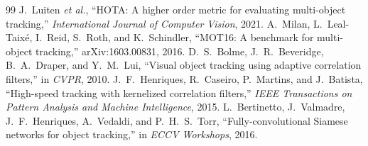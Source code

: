\documentclass[11pt,a4paper]{article}
\begin{document}
\begin{thebibliography}{99}
 J.~Luiten \emph{et al.}, ``HOTA: A higher order metric for evaluating multi-object tracking,'' \emph{International Journal of Computer Vision}, 2021.
 A.~Milan, L.~Leal-Taixé, I.~Reid, S.~Roth, and K.~Schindler, ``MOT16: A benchmark for multi-object tracking,'' arXiv:1603.00831, 2016.
 D.~S.~Bolme, J.~R.~Beveridge, B.~A.~Draper, and Y.~M.~Lui, ``Visual object tracking using adaptive correlation filters,'' in \emph{CVPR}, 2010.
 J.~F.~Henriques, R.~Caseiro, P.~Martins, and J.~Batista, ``High-speed tracking with kernelized correlation filters,'' \emph{IEEE Transactions on Pattern Analysis and Machine Intelligence}, 2015.
 L.~Bertinetto, J.~Valmadre, J.~F.~Henriques, A.~Vedaldi, and P.~H.~S.~Torr, ``Fully-convolutional Siamese networks for object tracking,'' in \emph{ECCV Workshops}, 2016.
\end{thebibliography}
\end{document}
